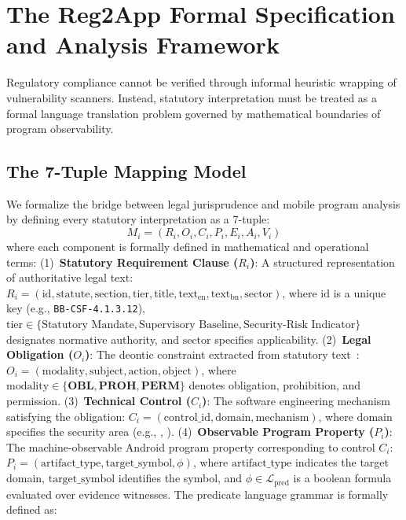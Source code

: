 \section{The Reg2App Formal Specification and Analysis Framework}
\label{sec:formal_framework}

Regulatory compliance cannot be verified through informal heuristic wrapping of vulnerability scanners. Instead, statutory interpretation must be treated as a formal language translation problem governed by mathematical boundaries of program observability.

\subsection{The 7-Tuple Mapping Model}
\label{sec:formal:tuple}

We formalize the bridge between legal jurisprudence and mobile program analysis by defining every statutory interpretation as a 7-tuple:
\begin{equation}
M_i = (R_i, O_i, C_i, P_i, E_i, A_i, V_i)
\end{equation}
where each component is formally defined in mathematical and operational terms:
(1)~\textbf{Statutory Requirement Clause ($R_i$)}: A structured representation of authoritative legal text: $R_i = (\text{id}, \text{statute}, \text{section}, \text{tier}, \text{title}, \text{text}_{\text{en}}, \text{text}_{\text{bn}}, \text{sector})$, where $\text{id}$ is a unique key (e.g., \texttt{BB-CSF-4.1.3.12}), $\text{tier} \in \{\text{Statutory Mandate}, \text{Supervisory Baseline}, \text{Security-Risk Indicator}\}$ designates normative authority, and $\text{sector}$ specifies applicability.
(2)~\textbf{Legal Obligation ($O_i$)}: The deontic constraint extracted from statutory text~\cite{legalruleml, breaux_requirements}: $O_i = (\text{modality}, \text{subject}, \text{action}, \text{object})$, where $\text{modality} \in \{\mathbf{OBL}, \mathbf{PROH}, \mathbf{PERM}\}$ denotes obligation, prohibition, and permission.
(3)~\textbf{Technical Control ($C_i$)}: The software engineering mechanism satisfying the obligation: $C_i = (\text{control\_id}, \text{domain}, \text{mechanism})$, where $\text{domain}$ specifies the security area (e.g., , ).
(4)~\textbf{Observable Program Property ($P_i$)}: The machine-observable Android program property corresponding to control $C_i$: $P_i = (\text{artifact\_type}, \text{target\_symbol}, \phi)$, where $\text{artifact\_type}$ indicates the target domain, $\text{target\_symbol}$ identifies the symbol, and $\phi \in \mathcal{L}_{\text{pred}}$ is a boolean formula evaluated over evidence witnesses. The predicate language grammar is formally defined as:
